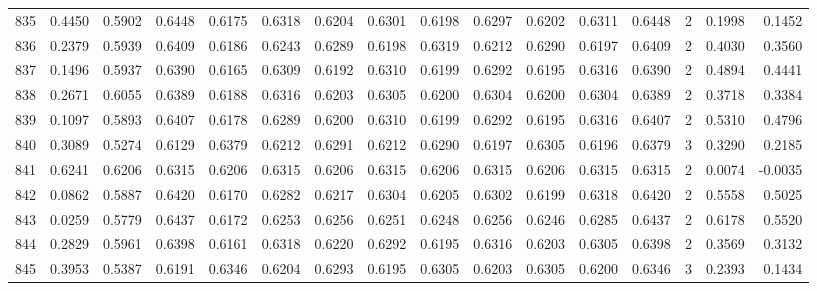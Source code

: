 \begin{tabular}{lrrrrrrrrrrrrrrr}
835 &      0.4450 &  0.5902 &  0.6448 &  0.6175 &  0.6318 &  0.6204 &  0.6301 &  0.6198 &  0.6297 &  0.6202 &   0.6311 &     0.6448 &      2 &                    0.1998 &                     0.1452 \\
836 &      0.2379 &  0.5939 &  0.6409 &  0.6186 &  0.6243 &  0.6289 &  0.6198 &  0.6319 &  0.6212 &  0.6290 &   0.6197 &     0.6409 &      2 &                    0.4030 &                     0.3560 \\
837 &      0.1496 &  0.5937 &  0.6390 &  0.6165 &  0.6309 &  0.6192 &  0.6310 &  0.6199 &  0.6292 &  0.6195 &   0.6316 &     0.6390 &      2 &                    0.4894 &                     0.4441 \\
838 &      0.2671 &  0.6055 &  0.6389 &  0.6188 &  0.6316 &  0.6203 &  0.6305 &  0.6200 &  0.6304 &  0.6200 &   0.6304 &     0.6389 &      2 &                    0.3718 &                     0.3384 \\
839 &      0.1097 &  0.5893 &  0.6407 &  0.6178 &  0.6289 &  0.6200 &  0.6310 &  0.6199 &  0.6292 &  0.6195 &   0.6316 &     0.6407 &      2 &                    0.5310 &                     0.4796 \\
840 &      0.3089 &  0.5274 &  0.6129 &  0.6379 &  0.6212 &  0.6291 &  0.6212 &  0.6290 &  0.6197 &  0.6305 &   0.6196 &     0.6379 &      3 &                    0.3290 &                     0.2185 \\
841 &      0.6241 &  0.6206 &  0.6315 &  0.6206 &  0.6315 &  0.6206 &  0.6315 &  0.6206 &  0.6315 &  0.6206 &   0.6315 &     0.6315 &      2 &                    0.0074 &                    -0.0035 \\
842 &      0.0862 &  0.5887 &  0.6420 &  0.6170 &  0.6282 &  0.6217 &  0.6304 &  0.6205 &  0.6302 &  0.6199 &   0.6318 &     0.6420 &      2 &                    0.5558 &                     0.5025 \\
843 &      0.0259 &  0.5779 &  0.6437 &  0.6172 &  0.6253 &  0.6256 &  0.6251 &  0.6248 &  0.6256 &  0.6246 &   0.6285 &     0.6437 &      2 &                    0.6178 &                     0.5520 \\
844 &      0.2829 &  0.5961 &  0.6398 &  0.6161 &  0.6318 &  0.6220 &  0.6292 &  0.6195 &  0.6316 &  0.6203 &   0.6305 &     0.6398 &      2 &                    0.3569 &                     0.3132 \\
845 &      0.3953 &  0.5387 &  0.6191 &  0.6346 &  0.6204 &  0.6293 &  0.6195 &  0.6305 &  0.6203 &  0.6305 &   0.6200 &     0.6346 &      3 &                    0.2393 &                     0.1434 \\

\end{tabular}
